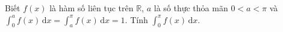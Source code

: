 \begin{ex}
Biết $f(x)$ là hàm số liên tục trên $\mathbb R$, $a$ là số thực thỏa mãn $0<a<\pi$ và $\displaystyle\int_0^af(x)\,\mathrm dx=\int_a^\pi f(x)\,\mathrm dx=1$. Tính $\displaystyle\int_0^\pi f(x)\,\mathrm dx$.
\end{ex}
